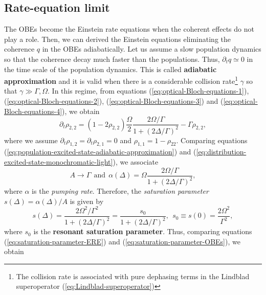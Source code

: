 {%
\subsection{Rate-equation limit}
\label{sec:rate-equation-limit}

The OBEs become the Einstein rate equations when the coherent effects do not play a role. Then, we can derived the Einstein equations eliminating the coherence $ q $ in the OBEs adiabatically. Let us assume a slow population dynamics so that the coherence decay much faster than the populations. Thus, $ \partial_t q \simeq 0 $ in the time scale of the population dynamics. This is called \textbf{adiabatic approximation} and it is valid when there is a considerable collision rate\footnote{The collision rate is associated with pure dephasing terms in the Lindblad superoperator (\ref{eq:Lindblad-superoperator})} $ \gamma $ so that $ \gamma \gg \Gamma, \Omega $. In this regime, from equations (\ref{eq:optical-Bloch-equations-1}), (\ref{eq:optical-Bloch-equations-2}), (\ref{eq:optical-Bloch-equations-3}) and (\ref{eq:optical-Bloch-equations-4}), we obtain
\begin{equation}
	\partial_t \rho_{2,2} = (1 - 2\rho_{2,2})\frac{\Omega}{2}\frac{2\Omega / \Gamma}{1 + (2\Delta / \Gamma)^2} - \Gamma \rho_{2,2},
	\label{eq:population-excited-state-adiabatic-approximation}
\end{equation}
where we assume $ \partial_t \rho_{1,2} = \partial_t \rho_{2,1} = 0 $ and $ \rho_{1,1} = 1 - \rho_{22} $. Comparing equations (\ref{eq:population-excited-state-adiabatic-approximation}) and (\ref{eq:distribution-excited-state-monochromatic-light}), we associate
\begin{equation}
	A \rightarrow \Gamma \ \ \textrm{and}\ \ \alpha(\Delta) = \Omega\frac{2\Omega / \Gamma}{1 + (2\Delta / \Gamma)^2},
\end{equation}
where $ \alpha $ is the \textit{pumping rate}. Therefore, the \textit{saturation parameter} $ s(\Delta) = \alpha(\Delta) / A $ is given by
\begin{equation}
	s(\Delta) = \frac{2\Omega^2 / \Gamma^2}{1 + (2\Delta / \Gamma)^2} = \frac{s_0}{1 + (2\Delta/\Gamma)^2},\ \ s_0 \equiv s(0) = \frac{2\Omega^2}{\Gamma^2},
	\label{eq:saturation-parameter-OBEs}
\end{equation}
where $ s_0 $ is the \textbf{resonant saturation parameter}. Thus, comparing equations (\ref{eq:saturation-parameter-ERE}) and (\ref{eq:saturation-parameter-OBEs}), we obtain
}
